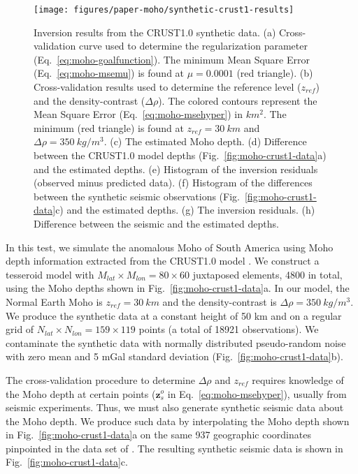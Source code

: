\begin{figure}
    \centering
    \texttt{[image: figures/paper-moho/synthetic-crust1-results]}
    \caption{
        Inversion results from the CRUST1.0 synthetic data.
        (a) Cross-validation curve used to determine
        the regularization parameter (Eq.~\ref{eq:moho-goalfunction}).
        The minimum Mean Square Error (Eq.~\ref{eq:moho-msemu}) is found at
        $\mu = 0.0001$ (red triangle).
        (b) Cross-validation results used to determine
        the reference level ($z_{ref}$) and the density-contrast ($\Delta\rho$).
        The colored contours represent
        the Mean Square Error (Eq.~\ref{eq:moho-msehyper}) in $km^2$.
        The minimum (red triangle) is found at $z_{ref} = 30\ km$
        and $\Delta\rho = 350\ kg/m^3$.
        (c) The estimated Moho depth.
        (d) Difference between the CRUST1.0 model depths
        (Fig.~\ref{fig:moho-crust1-data}a)
        and the estimated depths.
        (e) Histogram of the inversion residuals
        (observed minus predicted data).
        (f) Histogram of the differences between
        the synthetic seismic observations (Fig.~\ref{fig:moho-crust1-data}c)
        and the estimated depths.
        (g) The inversion residuals.
        (h) Difference between the seismic and the estimated depths.
    }
    \label{fig:moho-crust1-results}
\end{figure}


In this test, we simulate the anomalous Moho of South America
using Moho depth information extracted from the CRUST1.0 model
\citep{laske2013}.
We construct a tesseroid model with
$M_{lat} \times M_{lon} = 80 \times 60$ juxtaposed elements, 4800 in total,
using the Moho depths shown in Fig.~\ref{fig:moho-crust1-data}a.
In our model, the Normal Earth Moho is $z_{ref} = 30\ km$ and
the density-contrast is $\Delta\rho = 350\ kg/m^3$.
We produce the synthetic data at a constant height of 50 km
and on a regular grid of $N_{lat} \times N_{lon} = 159 \times 119$ points
(a total of 18921 observations).
We contaminate the synthetic data with normally distributed pseudo-random noise
with zero mean and 5 mGal standard deviation (Fig.~\ref{fig:moho-crust1-data}b).

The cross-validation procedure to determine $\Delta\rho$ and $z_{ref}$
requires knowledge of the Moho depth at certain points
($\mathbf{z}_s^o$ in Eq.~\ref{eq:moho-msehyper}),
usually from seismic experiments.
Thus, we must also generate synthetic seismic data about the Moho depth.
We produce such data by interpolating the Moho depth shown in
Fig.~\ref{fig:moho-crust1-data}a on the same 937 geographic coordinates
pinpointed in the data set of \citet{assumpcao2013a}.
The resulting synthetic seismic data is shown in Fig.~\ref{fig:moho-crust1-data}c.

